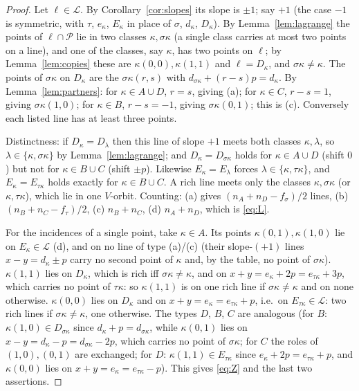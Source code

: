 \documentclass[11pt]{article}
\theoremstyle{remark}
\newcommand{\Lc}{\mathcal{L}}
\newcommand{\Pset}{\mathcal{P}}
\begin{document}
\begin{proof}
Let $\ell\in\Lc$.  By Corollary~\ref{cor:slopes} its slope is $\pm1$; say $+1$ (the case $-1$ is symmetric, with
$\tau$, $e_\kappa$, $E_\kappa$ in place of $\sigma$, $d_\kappa$, $D_\kappa$).  By Lemma~\ref{lem:lagrange} the points of
$\ell\cap\Pset$ lie in two classes $\kappa,\sigma\kappa$ (a single class carries at most two points on a line), and
one of the classes, say $\kappa$, has two points on $\ell$; by Lemma~\ref{lem:copies} these are $\kappa(0,0),\kappa(1,1)$
and $\ell=D_\kappa$, and $\sigma\kappa\ne\kappa$.  The points of $\sigma\kappa$ on $D_\kappa$ are the
$\sigma\kappa(r,s)$ with $d_{\sigma\kappa}+(r-s)p=d_\kappa$.  By Lemma~\ref{lem:partners}: for $\kappa\in A\cup D$,
$r=s$, giving (a); for $\kappa\in C$, $r-s=1$, giving $\sigma\kappa(1,0)$; for $\kappa\in B$, $r-s=-1$, giving
$\sigma\kappa(0,1)$; this is (c).  Conversely each listed line has at least three points.

Distinctness: if $D_\kappa=D_\lambda$ then this line of slope $+1$ meets both classes $\kappa,\lambda$, so
$\lambda\in\{\kappa,\sigma\kappa\}$ by Lemma~\ref{lem:lagrange}; and $D_\kappa=D_{\sigma\kappa}$ holds for $\kappa\in A\cup D$
(shift $0$) but not for $\kappa\in B\cup C$ (shift $\pm p$).  Likewise $E_\kappa=E_\lambda$ forces
$\lambda\in\{\kappa,\tau\kappa\}$, and $E_\kappa=E_{\tau\kappa}$ holds exactly for $\kappa\in B\cup C$.  A rich line meets
only the classes $\kappa,\sigma\kappa$ (or $\kappa,\tau\kappa$), which lie in one $V$-orbit.  Counting: (a) gives
$(n_A+n_D-f_\sigma)/2$ lines, (b) $(n_B+n_C-f_\tau)/2$, (c) $n_B+n_C$, (d) $n_A+n_D$, which is \eqref{eq:L}.

For the incidences of a single point, take $\kappa\in A$.  Its points $\kappa(0,1),\kappa(1,0)$ lie on $E_\kappa\in\Lc$
(d), and on no line of type (a)/(c) (their slope-$(+1)$ lines $x-y=d_\kappa\pm p$ carry no second point of
$\kappa$ and, by the table, no point of $\sigma\kappa$).  $\kappa(1,1)$ lies on $D_\kappa$, which is rich iff
$\sigma\kappa\ne\kappa$, and on $x+y=e_\kappa+2p=e_{\tau\kappa}+3p$, which carries no point of $\tau\kappa$: so
$\kappa(1,1)$ is on one rich line if $\sigma\kappa\neq\kappa$ and on none otherwise.  $\kappa(0,0)$ lies on
$D_\kappa$ and on $x+y=e_\kappa=e_{\tau\kappa}+p$, i.e.\ on $E_{\tau\kappa}\in\Lc$: two rich lines if $\sigma\kappa\ne\kappa$,
one otherwise.  The types $D$, $B$, $C$ are analogous (for $B$: $\kappa(1,0)\in D_{\sigma\kappa}$ since
$d_\kappa+p=d_{\sigma\kappa}$, while $\kappa(0,1)$ lies on $x-y=d_\kappa-p=d_{\sigma\kappa}-2p$, which carries no point of
$\sigma\kappa$; for $C$ the roles of $(1,0),(0,1)$ are exchanged; for $D$: $\kappa(1,1)\in E_{\tau\kappa}$ since
$e_\kappa+2p=e_{\tau\kappa}+p$, and $\kappa(0,0)$ lies on $x+y=e_\kappa=e_{\tau\kappa}-p$).  This gives \eqref{eq:Z}
and the last two assertions.
\end{proof}
\end{document}
